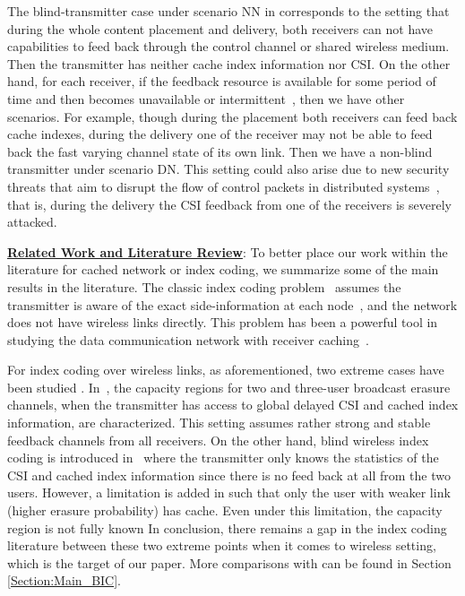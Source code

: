 \documentclass[journal,12pt,draftcls,onecolumn]{IEEEtran}
\begin{document}
The blind-transmitter case under scenario NN in \cite{kao2016blind} corresponds to the setting that during the whole content placement and delivery, both receivers can not have capabilities to feed back through the control channel or shared wireless medium. Then the transmitter has neither cache index information nor CSI. On the other hand, for each receiver, if the feedback resource is available for some period of time and then becomes unavailable or intermittent~\cite{IFB-ITW,IntermittentIHsiang}, then we have other scenarios. For example, though during the placement both receivers can feed back cache indexes, during the delivery one of the receiver may not be able to feed back the fast varying channel state of its own link. Then we have a non-blind transmitter under scenario DN.  This setting could also arise due to new security threats that aim to disrupt the flow of control packets in distributed systems~\cite{liu2020adversarial,sadeghi2018adversarial,sadeghi2019physical}, that is, during the delivery the CSI feedback from one of the receivers is severely attacked.


\noindent \underline{\bf Related Work and Literature Review}: To better place our work within the literature for cached network or index coding, we summarize some of the main results {in the literature}. The classic index coding problem~\cite{birk2006coding,bar2011index,alon2008broadcasting} assumes the transmitter is aware of the exact side-information at each node~\cite{chaudhry2008efficient,ong2014linear}, and the network does not have wireless links directly. This problem has been a powerful tool in studying the data communication network with receiver caching~\cite{jafar2013topological,maleki2014index,maddah2014fundamental}.

For index coding over wireless links, as aforementioned, two extreme cases have been studied \cite{kao2016blind}\cite{ghorbel2016content}. In~\cite{ghorbel2016content}, the capacity regions for two and three-user broadcast erasure channels, when the transmitter has access to global delayed CSI and cached index information, are characterized. This setting assumes rather strong and stable feedback channels from all receivers. On the other hand,  blind wireless index coding is introduced in~\cite{kao2016blind} where the transmitter only knows the statistics of the CSI and cached index information since there is no feed back at all from the two users. However, a limitation is added in \cite{kao2016blind} such that only the user with weaker link (higher erasure probability) has cache. Even under this limitation, the capacity region is not fully known In conclusion, there remains a gap in the index coding literature between these two extreme points when it comes to wireless setting, which is the target of our paper. More comparisons with \cite{kao2016blind}\cite{ghorbel2016content} can be found in Section \ref{Section:Main_BIC}.
\end{document}
